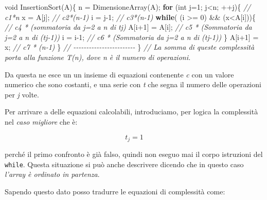 \documentclass[
]{article}
\newenvironment{Shaded}{}{}
\newcommand{\CommentTok}[1]{\textcolor[rgb]{0.38,0.63,0.69}{\textit{#1}}}
\newcommand{\ControlFlowTok}[1]{\textcolor[rgb]{0.00,0.44,0.13}{\textbf{#1}}}
\newcommand{\DataTypeTok}[1]{\textcolor[rgb]{0.56,0.13,0.00}{#1}}
\newcommand{\DecValTok}[1]{\textcolor[rgb]{0.25,0.63,0.44}{#1}}
\newcommand{\NormalTok}[1]{#1}
\begin{document}
\begin{Shaded}
\begin{Highlighting}[]
\DataTypeTok{void}\NormalTok{ InsertionSort(A)\{}
\NormalTok{    n = DimensioneArray(A);}
    \ControlFlowTok{for}\NormalTok{ (}\DataTypeTok{int}\NormalTok{ j=}\DecValTok{1}\NormalTok{; j\textless{}n; ++j)\{		  }\CommentTok{// c1*n}
\NormalTok{        x = A[j];				  	 }\CommentTok{// c2*(n{-}1)}
\NormalTok{        i = j{-}}\DecValTok{1}\NormalTok{;				   	 }\CommentTok{// c3*(n{-}1)}
        \ControlFlowTok{while}\NormalTok{( (i \textgreater{}= }\DecValTok{0}\NormalTok{) \&\& (x\textless{}A[i]))\{ }\CommentTok{// c4 * (sommatoria da j=2 a n di tj)}
\NormalTok{            A[i+}\DecValTok{1}\NormalTok{] = A[i];			 }\CommentTok{// c5 * (Sommatoria da j=2 a n di (tj{-}1))}
\NormalTok{            i = i{-}}\DecValTok{1}\NormalTok{;  				}\CommentTok{// c6 * (Sommatoria da j=2 a n di (tj{-}1))}
\NormalTok{        \}}
\NormalTok{        A[i+}\DecValTok{1}\NormalTok{] = x;					}\CommentTok{// c7 * (n{-}1)}
\NormalTok{    \}							 }\CommentTok{// {-}{-}{-}{-}{-}{-}{-}{-}{-}{-}{-}{-}{-}{-}{-}{-}{-}{-}{-}{-}{-}{-}{-}{-}}
\NormalTok{\}								}\CommentTok{// La somma di queste complessità porta alla funzione T(n), dove n è il numero di operazioni.}
\end{Highlighting}
\end{Shaded}

Da questa ne esce un un insieme di equazioni contenente \emph{c} con un
valore numerico che sono costanti, e una serie con \emph{t} che segna il
numero delle operazioni per \emph{j} volte.

Per arrivare a delle equazioni calcolabili, introduciamo, per logica la
complessità nel \emph{caso migliore} che è:

\[t_j = 1\]

perché il primo confronto è già falso, quindi non eseguo mai il corpo
istruzioni del \texttt{while}. Questa situazione si può anche descrivere
dicendo che in questo caso \emph{l'array è ordinato in partenza}.

Sapendo questo dato posso tradurre le equazioni di complessità come:
\end{document}
